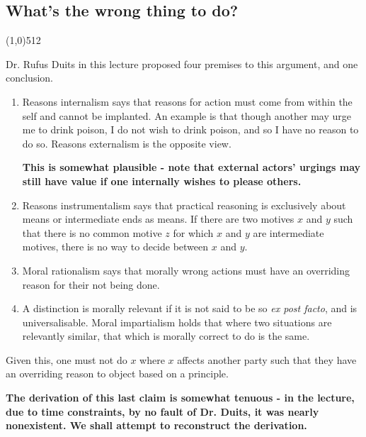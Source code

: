\documentclass[11pt,a4paper]{report}
\let\origsection\subsection
\renewcommand{\subsection}[1]{\origsection{#1}\vspace{-0.5em}\line(1,0){512}\vspace{-1em}}
\begin{document}
	\subsection{What's the wrong thing to do?}
	
	\begin{multicols}{2}
		
		Dr. Rufus Duits in this lecture proposed four premises to this argument, and one conclusion.
		
		\begin{enumerate}
			
			\item Reasons internalism says that reasons for action must come from within the self and cannot be implanted. An example is that though another may urge me to drink poison, I do not wish to drink poison, and so I have no reason to do so. Reasons externalism is the opposite view.
			
			\textbf{This is somewhat plausible - note that external actors' urgings may still have value if one internally wishes to please others.}
			
			\item Reasons instrumentalism says that practical reasoning is exclusively about means or intermediate ends as means. If there are two motives \(x\) and \(y\) such that there is no common motive \(z\) for which \(x\) and \(y\) are intermediate motives, there is no way to decide between \(x\) and \(y\).
			
			\item Moral rationalism says that morally wrong actions must have an overriding reason for their not being done. 
			
			\item A distinction is morally relevant if it is not said to be so \textit{ex post facto}, and is universalisable. Moral impartialism holds that where two situations are relevantly similar, that which is morally correct to do is the same.
			
		\end{enumerate}
		
		Given this, one must not do \(x\) where \(x\) affects another party such that they have an overriding reason to object based on a principle. 
		
		\textbf{The derivation of this last claim is somewhat tenuous - in the lecture, due to time constraints, by no fault of Dr. Duits, it was nearly nonexistent. We shall attempt to reconstruct the derivation.}
		

\end{multicols}
\end{document}
